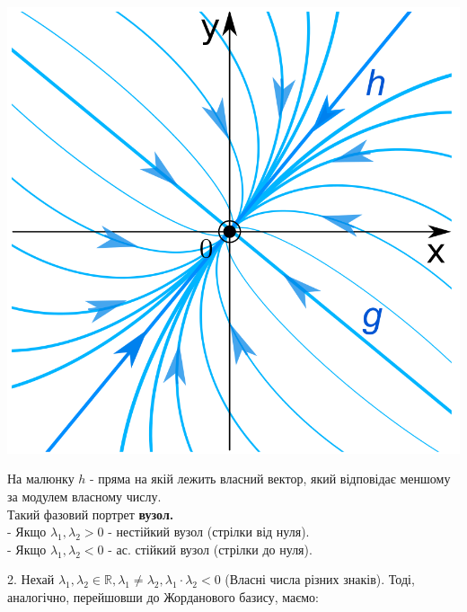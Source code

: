 \begin{center} \includegraphics[scale=0.3]{assets/lectures_recent-deaf1762.png} \end{center}

На малюнку $h$ - пряма на якій лежить власний вектор, який відповідає меншому за модулем власному числу.\\
Такий фазовий портрет \textbf{вузол.}\\
- Якщо $\lambda_1, \lambda_2 > 0$ - нестійкий вузол (стрілки від нуля).\\
- Якщо $\lambda_1, \lambda_2 < 0$ - ас. стійкий вузол (стрілки до нуля).

2. Нехай $ \lambda_1 , \lambda_2 \in \mathbb{R}, \lambda_1 \neq \lambda_2, \lambda_1 \cdot \lambda_2 < 0$ (Власні числа різних знаків).
Тоді, аналогічно, перейшовши до Жорданового базису, маємо:

